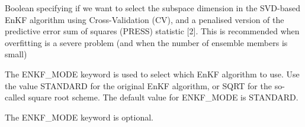 \documentclass[letterpaper,10pt,english]{sphinxmanual}
\begin{document}
\begin{sphinxShadowBox}

Boolean specifying if we want to select the subspace dimension in the
SVD-based EnKF algorithm using Cross-Validation (CV), and a penalised version
of the predictive error sum of squares (PRESS) statistic {[}2{]}. This is
recommended when overfitting is a severe problem (and when the number of
ensemble members is small)


%
\begin{sphinxVerbatim}[commandchars=\\\{\}]
      
 

    
 
\end{sphinxVerbatim}
\end{sphinxShadowBox}
\label{\detokenize{keywords/index:enkf-mode}}
\begin{sphinxShadowBox}

The ENKF\_MODE keyword is used to select which EnKF algorithm to use. Use the
value STANDARD for the original EnKF algorithm, or SQRT for the so-called
square root scheme. The default value for ENKF\_MODE is STANDARD.


%
\begin{sphinxVerbatim}[commandchars=\\\{\}]
     
 
\end{sphinxVerbatim}


%
\begin{sphinxVerbatim}[commandchars=\\\{\}]
    
 
\end{sphinxVerbatim}

The ENKF\_MODE keyword is optional.
\end{sphinxShadowBox}
\end{document}
